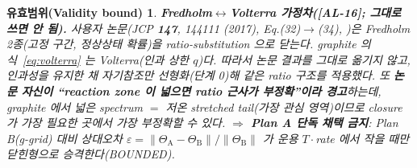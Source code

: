 \documentclass[11pt,a4paper]{article}
\newtheorem*{boundbox}{유효범위(Validity bound)}
\newcommand{\AL}[1]{\textsf{[AL-#1]}}
\begin{document}
\begin{boundbox}
\textbf{Fredholm$\leftrightarrow$Volterra 가정차(\AL{16}; 그대로 쓰면 안 됨).} 사용자 논문(\emph{JCP}
\textbf{147}, 144111 (2017), Eq.(32)$\to$(34), \cite{jcp2017})은 \emph{Fredholm} 2종(고정 구간, 정상상태 확률)을
ratio-substitution 으로 닫는다. graphite 의 식~\eqref{eq:volterra} 는 \emph{Volterra}(인과 상한 $q$)다. 따라서
논문 결과를 그대로 옮기지 않고, 인과성을 유지한 채 자기참조만 선형화(단계 0)해 \emph{같은} ratio 구조를 적용했다.
또 \textbf{논문 자신이 ``reaction zone 이 넓으면 ratio 근사가 부정확''이라 경고}하는데, graphite 에서 넓은
spectrum $=$ 저온 stretched tail(가장 관심 영역)이므로 closure 가 가장 필요한 곳에서 가장 부정확할 수 있다.
$\Rightarrow$ \textbf{Plan A 단독 채택 금지}: Plan B(g-grid) 대비 상대오차
$\varepsilon=\lVert\Theta_\mathrm A-\Theta_\mathrm B\rVert/\lVert\Theta_\mathrm B\rVert$ 가 운용 $T\cdot$rate 에서
작을 때만 닫힌형으로 승격한다(BOUNDED).
\end{boundbox}

\end{document}
